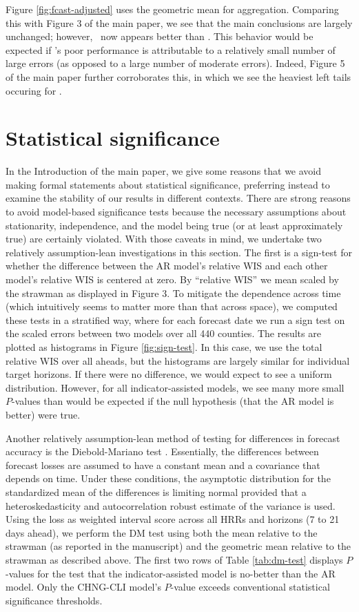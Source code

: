 Figure \ref{fig:fcast-adjusted} uses the geometric
mean for aggregation.  Comparing this with Figure 3 of the main paper,
we see that the main conclusions are largely unchanged; however,
\chngcli~now appears better than \ar.  This behavior would be
expected if \chngcli's poor performance is attributable to a
relatively small number of large errors (as opposed to a large number
of moderate errors).  Indeed, Figure 5 of the main paper further
corroborates this, in which we see the heaviest left tails occuring
for \chngcli.

\section{Statistical significance}

In the Introduction of the main paper, we give some reasons that we avoid making
formal statements about statistical significance, preferring instead to examine
the stability of our results in different contexts. There are strong reasons to
avoid model-based significance tests because the necessary assumptions about
stationarity, independence, and the  model being true (or at least approximately
true) are certainly violated. With those caveats in mind, we undertake two
relatively assumption-lean investigations in this section. The first is a
sign-test for whether the difference between the AR model’s relative WIS  and
each other model’s relative WIS is centered at zero. By ``relative WIS'' we mean
scaled by the strawman as displayed in Figure 3. To mitigate the dependence
across time (which intuitively seems to matter more than that across space), we
computed these tests in a stratified way, where for each forecast date we run a
sign test on the scaled errors between two models over all 440 counties. The
results are plotted as histograms in Figure \ref{fig:sign-test}. In this case,
we use the total relative WIS over all aheads, but the histograms are largely
similar for individual target horizons. If there were no difference, we would
expect to see a uniform distribution. However, for all indicator-assisted
models, we see many more small $P$-values than would be expected if the null
hypothesis (that the AR model is better) were true.

Another relatively assumption-lean method of testing for differences in forecast
accuracy is the Diebold-Mariano test \cite{Diebold:2002, Diebold:2015,
  Harvey:1997}. Essentially, the differences between forecast losses are assumed
to have a constant mean and a covariance that depends on time. Under these
conditions, the asymptotic distribution for the standardized mean of the
differences is limiting normal provided that a heteroskedasticity and
autocorrelation robust estimate of the variance is used. Using the loss as
weighted interval score across all HRRs and horizons (7 to 21 days ahead), we
perform the DM test using both the mean relative to the strawman (as reported in
the manuscript) and the geometric mean relative to the strawman as described
above. The first two rows of Table \ref{tab:dm-test} displays $P$-values for the
test that the indicator-assisted model is no-better than the AR model. Only the
CHNG-CLI model's $P$-value exceeds conventional statistical significance
thresholds.   

